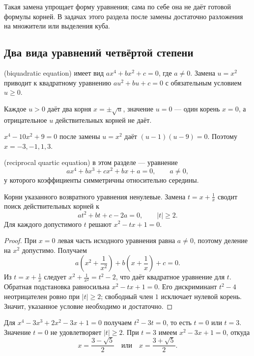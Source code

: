 Такая замена упрощает форму уравнения; сама по себе она не даёт готовой формулы корней. В задачах этого раздела после замены достаточно разложения на множители или выделения куба.

\subsection*{Два вида уравнений четвёртой степени}
\begin{definition}
 (biquadratic equation) имеет вид \(ax^4+bx^2+c=0\), где \(a\neq0\). Замена \(u=x^2\) приводит к квадратному уравнению \(au^2+bu+c=0\) с обязательным условием \(u\geq0\).
\end{definition}
Каждое \(u>0\) даёт два корня \(x=\pm\sqrt u\), значение \(u=0\) — один корень \(x=0\), а отрицательное \(u\) действительных корней не даёт.

\begin{example}
\(x^4-10x^2+9=0\) после замены \(u=x^2\) даёт \((u-1)(u-9)=0\). Поэтому \(x=-3,-1,1,3\).
\end{example}

\begin{definition}
 (reciprocal quartic equation) в этом разделе — уравнение
\[
ax^4+bx^3+cx^2+bx+a=0,\qquad a\neq0,
\]
у которого коэффициенты симметричны относительно середины.
\end{definition}

\begin{theorem}
Корни указанного возвратного уравнения ненулевые. Замена \(t=x+\frac1x\) сводит поиск действительных корней к
\[
at^2+bt+c-2a=0,\qquad |t|\geq2.
\]
Для каждого допустимого \(t\) решают \(x^2-tx+1=0\).
\end{theorem}
\begin{proof}
При \(x=0\) левая часть исходного уравнения равна \(a\neq0\), поэтому деление на \(x^2\) допустимо. Получаем
\[
a\left(x^2+\frac1{x^2}\right)+b\left(x+\frac1x\right)+c=0.
\]
Из \(t=x+\frac1x\) следует \(x^2+\frac1{x^2}=t^2-2\), что даёт квадратное уравнение для \(t\). Обратная подстановка равносильна \(x^2-tx+1=0\). Его дискриминант \(t^2-4\) неотрицателен ровно при \(|t|\geq2\); свободный член \(1\) исключает нулевой корень. Значит, указанное условие необходимо и достаточно.
\end{proof}

\begin{example}
Для \(x^4-3x^3+2x^2-3x+1=0\) получаем \(t^2-3t=0\), то есть \(t=0\) или \(t=3\). Значение \(t=0\) не удовлетворяет \(|t|\geq2\). При \(t=3\) имеем \(x^2-3x+1=0\), откуда
\[
x=\frac{3-\sqrt5}{2}\quad\text{или}\quad x=\frac{3+\sqrt5}{2}.
\]
\end{example}
